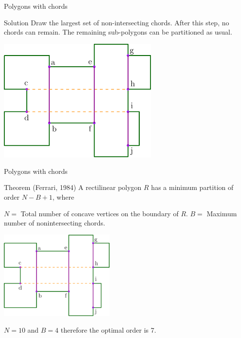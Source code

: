 \documentclass{beamer}
\begin{document}
\begin{frame}[t]{Polygons with chords}	
	\begin{block}{Solution}
	Draw the largest set of non-intersecting chords. 
	After this step, no chords can remain.
    The remaining sub-polygons can be partitioned as usual.  

	\end{block}  
	\vspace{5px}
    \centering
    \includegraphics[width=0.6\textwidth]{intersect1.png}

\end{frame}


\begin{frame}[t]{Polygons with chords}	
	\begin{block}{Theorem (Ferrari, 1984)}
	A rectilinear polygon $R$ has a minimum partition of order $N - B + 1$, where
	
	
	$N = $ Total number of concave vertices on the boundary of $R$.
	$B = $ Maximum number of nonintersecting chords.

	\end{block}  
	\centering
    \includegraphics[width=0.43\textwidth]{intersect1.png}
    
    $N = 10$ and $B = 4$ therefore the optimal order is 7.

\end{frame}
\end{document}
